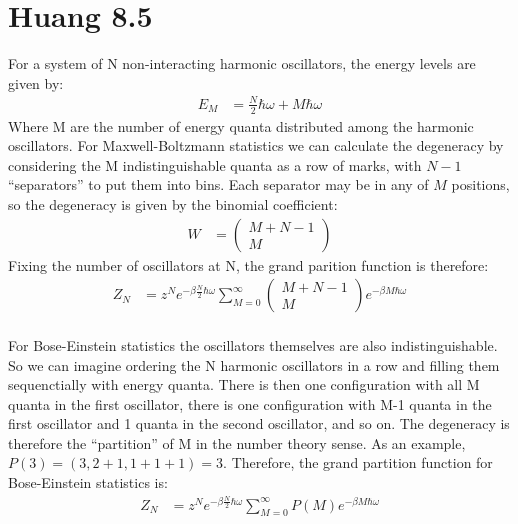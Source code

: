 \documentclass[a4paper,11pt]{article}
\numberwithin{equation}{section}
\begin{document}
\section{Huang 8.5}
For a system of N non-interacting harmonic oscillators, the energy levels are given by:
\begin{align}
 E_M &= \frac{N}{2}\hbar \omega + M\hbar \omega
\end{align}
Where M are the number of energy quanta distributed among the harmonic oscillators. 
For Maxwell-Boltzmann statistics we can calculate the degeneracy by considering the M indistinguishable quanta as a row of marks, with $N-1$ ``separators'' to put them into bins.
Each separator may be in any of $M$ positions, so the degeneracy is given by the binomial coefficient:
\begin{align}
 W &= \begin{pmatrix}
       M+N-1 \\
       M
      \end{pmatrix}
\end{align}
Fixing the number of oscillators at N, the grand parition function is therefore:
\begin{align}
 Z_N &= z^Ne^{-\beta\frac{N}{2}\hbar \omega}\sum_{M=0}^\infty \begin{pmatrix}
       M+N-1 \\
       M
      \end{pmatrix} e^{-\beta M\hbar \omega}
\end{align}
\\
For Bose-Einstein statistics the oscillators themselves are also indistinguishable. 
So we can imagine ordering the N harmonic oscillators in a row and filling them sequenctially with energy quanta.
There is then one configuration with all M quanta in the first oscillator, there is one configuration with M-1 quanta in the first oscillator and 1 quanta in the second oscillator, and so on.
The degeneracy is therefore the ``partition'' of M in the number theory sense. As an example, $P(3) = (3, 2+1, 1+1+1) = 3$.
Therefore, the grand partition function for Bose-Einstein statistics is:
\begin{align}
 Z_N &= z^Ne^{-\beta\frac{N}{2}\hbar \omega}\sum_{M=0}^\infty P(M) e^{-\beta M\hbar \omega}
\end{align}
\end{document}
